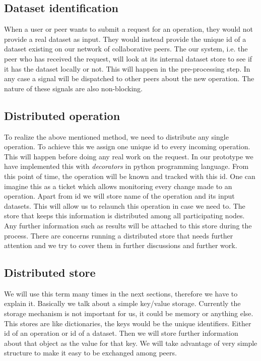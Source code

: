\subsection{Dataset identification}
When a user or peer wants to submit a request for an operation, they would not provide a real dataset as input.
They would instead provide the unique id of a dataset existing on our network of collaborative peers.
The our system, i.e. the peer who has received the request, will look at its internal dataset store to see if it
has the dataset locally or not.
This will happen in the pre-processing step. 
In any case a signal will be dispatched to other peers about the new operation.
The nature of these signals are also non-blocking.

\subsection{Distributed operation}
To realize the above mentioned method, we need to distribute any single operation. To achieve this we assign one unique id
to every incoming operation. This will happen before doing any real work on the request. In our prototype we have implemented
this with \textit{decorators} in python programming language. 
From this point of time, 
the operation will be known and tracked with this id. One can imagine this as a ticket which
allows monitoring every change made to an operation. 
Apart from id we will store name of the operation and its input datasets. 
This will allow us to relaunch this operation in case we need to. 
The store that keeps this information is distributed among all participating nodes. 
Any further information such as results will be attached to this store during the process. 
There are concerns running a distributed store that needs further attention and 
we try to cover them in further discussions and further work.

\subsection{Distributed store}
We will use this term many times in the next sections, therefore we have to explain it.
Basically we talk about a simple key/value storage. 
Currently the storage mechanism is not important for us, it could be memory or anything else.
This stores are like dictionaries, the keys would be the unique identifiers.
Either id of an operation or id of a dataset. 
Then we will store further information about that object as the value for that key.
We will take advantage of very simple structure to make it easy to be exchanged among peers.

